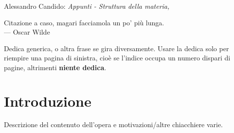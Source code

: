 \thispagestyle{empty}

\hfill

\vfill

\noindent Alessandro Candido: \textit{Appunti - Struttura della materia,}
\textcopyleft\ \DTMMonthname{\the\month} \the\year
\newline

\lipsum[2]

\setcounter{tocdepth}{2}
\tableofcontents
\markboth{\scshape{\contentsname}}{\scshape{\contentsname}}

\clearpage
{}
\thispagestyle{empty}

\vspace*{3cm}

\begin{center}
	Citazione a caso, magari facciamola un po' più lunga. \\ \medskip
	--- Oscar Wilde    
\end{center}

\medskip

\begin{center}
	Dedica generica, o altra frase se gira diversamente.
	Usare la dedica solo per riempire una pagina di sinistra, cioè se l'indice occupa un numero dispari di pagine, altrimenti \textbf{niente dedica}.
\end{center}


\chapter*{Introduzione}

Descrizione del contenuto dell'opera e motivazioni/altre chiacchiere varie.
\newline

\lipsum[1]
